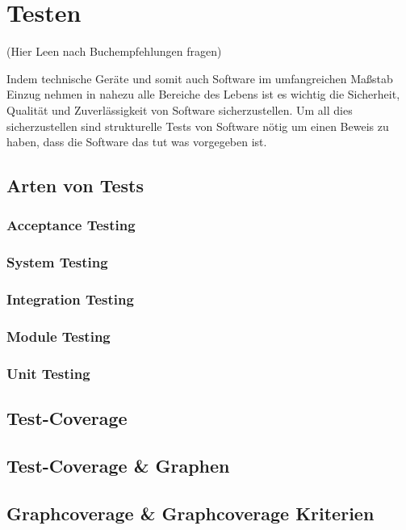 \section{Testen}

(Hier Leen nach Buchempfehlungen fragen)

Indem technische Geräte und somit auch Software im umfangreichen Maßstab Einzug nehmen in nahezu alle Bereiche des
Lebens ist es wichtig die Sicherheit, Qualität und Zuverlässigkeit von Software sicherzustellen.
Um all dies sicherzustellen sind strukturelle Tests von Software nötig um einen Beweis zu haben, dass die Software
das tut was vorgegeben ist.

\subsection{Arten von Tests }

\subsubsection{Acceptance Testing}

\subsubsection{System Testing}

\subsubsection{Integration Testing}

\subsubsection{Module Testing}

\subsubsection{Unit Testing}

\subsection{Test-Coverage}

\subsection{Test-Coverage & Graphen}

\subsection{Graphcoverage & Graphcoverage Kriterien}

